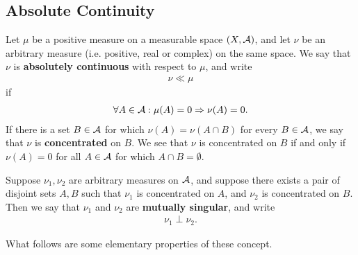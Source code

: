 \subsection{Absolute Continuity}

Let $\mu$ be a positive measure on a measurable space $(X, \mathcal{A})$, and let $\nu$ be an arbitrary measure (i.e. positive, real or complex) on the same space. We say that $\nu$ is \textbf{absolutely continuous} with respect to $\mu$, and write
\begin{align*}
	\nu \ll \mu
\end{align*}
if
\begin{align*}
	\forall A\in \mathcal{A}: \mu(A) = 0 \Rightarrow \nu(A) = 0.
\end{align*}
If there is a set $B\in \mathcal{A}$ for which $\nu(A)=\nu(A\cap B)$ for every $B\in \mathcal{A}$, we say that $\nu$ is \textbf{concentrated} on $B$. We see that $\nu$ is concentrated on $B$ if and only if $\nu(A)=0$ for all $A\in \mathcal{A}$ for which $A\cap B=\emptyset$.

Suppose $\nu_{1}, \nu_{2}$ are arbitrary measures on $\mathcal{A}$, and suppose there exists a pair of disjoint sets $A, B$ such that $\nu_{1}$ is concentrated on $A$, and $\nu_{2}$ is concentrated on $B$. Then we say that $\nu_{1}$ and $\nu_{2}$ are \textbf{mutually singular}, and write
\begin{align*}
	\nu_{1} \perp \nu_{2}.
\end{align*}

What follows are some elementary properties of these concept.

